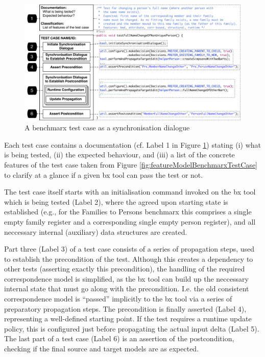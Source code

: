\begin{figure}[tb!]
	\centering
	\includegraphics[width=\columnwidth]{diagrams/testCase}
	\caption{A benchmarx test case as a synchronisation dialogue}
	\label{fig:benchmarxTestCase}
\end{figure}

Each test case contains a documentation (cf. Label 1 in Figure \ref{fig:benchmarxTestCase}) stating (i) what is being tested, (ii) the expected behaviour, and (iii) a list of the concrete features of the test case taken from Figure \ref{fig:featureModelBenchmarxTestCase} to clarify at a glance if a given bx tool can pass the test or not. 

The test case itself starts with an initialisation command invoked on the bx tool which is being tested (Label 2), where the agreed upon starting state is established (e.g., for the Families to Persons benchmarx this comprises a single empty family register and a corresponding single empty person register), and all neccessary internal (auxiliary) data structures are created.

Part three (Label 3) of a test case consists of a series of propagation steps, used to establish the precondition of the test. Although this creates a dependency to other tests (asserting exactly this precondition), the handling of the required correspondence model is simplified, as the bx tool can build up the neccessary internal state that must go along with the precondition. I.e. the old consistent correspondence model is ``passed'' implicitly to the bx tool via a series of preparatory propagation steps. The precondition is finally asserted (Label 4), representing a well-defined starting point. If the test requires a runtime update policy, this is configured just before propagating the actual input delta (Label 5). The last part of a test case (Label 6) is an assertion of the postcondition, checking if the final source and target models are as expected. 

